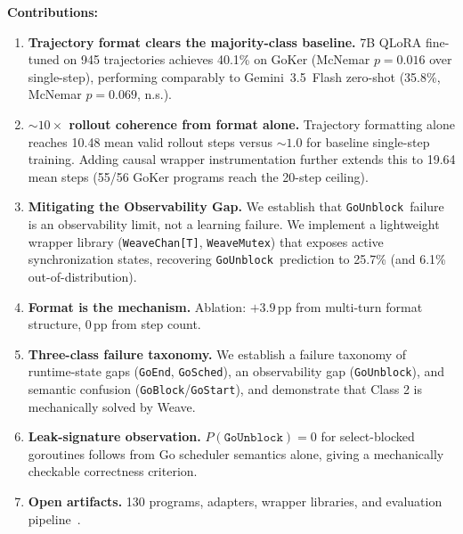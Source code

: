 \documentclass[10pt,conference]{IEEEtran}
\newcommand{\eblock}{\texttt{GoBlock}}
\newcommand{\eunblock}{\texttt{GoUnblock}}
\newcommand{\estart}{\texttt{GoStart}}
\newcommand{\eend}{\texttt{GoEnd}}
\newcommand{\esched}{\texttt{GoSched}}
\begin{document}
\textbf{Contributions:}
\begin{enumerate}
\item \textbf{Trajectory format clears the majority-class baseline.}
  7B QLoRA fine-tuned on 945 trajectories achieves 40.1\% on GoKer
  (McNemar $p{=}0.016$ over single-step), performing comparably to Gemini~3.5~Flash zero-shot (35.8\%, McNemar $p{=}0.069$, n.s.).
\item \textbf{${\sim}10\times$ rollout coherence from format alone.}
  Trajectory formatting alone reaches 10.48 mean valid rollout steps versus ${\sim}1.0$ for baseline single-step training.
  Adding causal wrapper instrumentation further extends this to 19.64 mean steps (55/56 GoKer programs reach the 20-step ceiling).
\item \textbf{Mitigating the Observability Gap.}
  We establish that \eunblock\ failure is an observability limit, not a learning failure.
  We implement a lightweight wrapper library (\texttt{WeaveChan[T]}, \texttt{WeaveMutex})
  that exposes active synchronization states, recovering \eunblock\ prediction to 25.7\% (and 6.1\% out-of-distribution).
\item \textbf{Format is the mechanism.}
  Ablation: $+3.9$\,pp from multi-turn format structure, $0$\,pp from step count.
\item \textbf{Three-class failure taxonomy.}
  We establish a failure taxonomy of runtime-state gaps (\eend, \esched), an observability gap (\eunblock), and semantic confusion (\eblock/\estart), and demonstrate that Class 2 is mechanically solved by Weave.
\item \textbf{Leak-signature observation.}
  $P(\eunblock){=}0$ for select-blocked goroutines follows from Go
  scheduler semantics alone, giving a mechanically checkable correctness criterion.
\item \textbf{Open artifacts.}
  130 programs, adapters, wrapper libraries, and evaluation pipeline~\cite{anon-artifacts}.
\end{enumerate}
\end{document}
